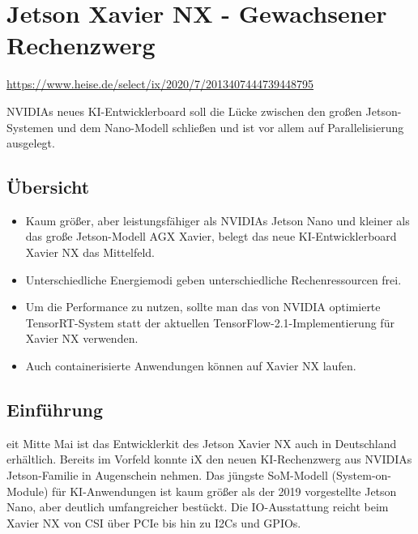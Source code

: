 %
%

\chapter{Jetson Xavier NX - Gewachsener Rechenzwerg }

\url{https://www.heise.de/select/ix/2020/7/2013407444739448795}




NVIDIAs neues KI-Entwicklerboard soll die Lücke zwischen den großen Jetson-Systemen und dem Nano-Modell schließen und ist vor allem auf Parallelisierung ausgelegt. 


\section{Übersicht}

  \begin{itemize}
  	\item  Kaum größer, aber leistungsfähiger als NVIDIAs Jetson Nano und kleiner als das große Jetson-Modell AGX Xavier, belegt das neue KI-Entwicklerboard Xavier NX das Mittelfeld. 
  	\item Unterschiedliche Energiemodi geben unterschiedliche Rechenressourcen frei. 
  	\item Um die Performance zu nutzen, sollte man das von NVIDIA optimierte TensorRT-­System statt der aktuellen TensorFlow-2.1-Implementierung für Xavier NX verwenden. 
    \item Auch containerisierte Anwendungen können auf Xavier NX laufen. 
  \end{itemize}


\section{Einführung}

eit Mitte Mai ist das Entwicklerkit des Jetson Xavier NX auch in Deutschland erhältlich. Bereits im Vorfeld konnte iX den neuen KI-Rechenzwerg aus NVIDIAs Jetson-Familie in Augenschein nehmen. Das jüngste SoM-­Modell (System-on-Module) für KI-Anwendungen ist kaum größer als der 2019 vorgestellte Jetson Nano, aber deutlich umfangreicher bestückt. Die IO-Ausstattung reicht beim Xavier NX von CSI über PCIe bis hin zu I2Cs und GPIOs. 

